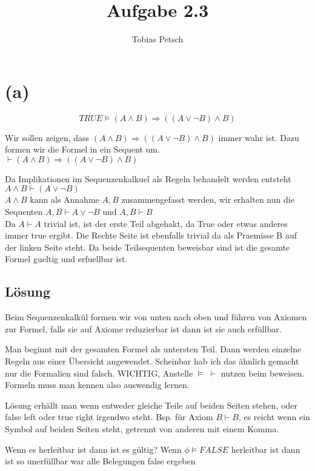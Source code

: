 \documentclass[a4paper,12pt]{article}
\title{Aufgabe 2.3}
\author{Tobias Petsch}
\date{}
\begin{document}
\maketitle

\section*{(a)}

\[
TRUE \models (A \land B) \Rightarrow ((A \lor \neg B) \land B)
\]

Wir sollen zeigen, dass $(A \land B) \Rightarrow ((A \lor \neg B) \land B)$ immer wahr ist.
Dazu formen wir die Formel in ein Sequent um. \\
$\vdash (A \land B) \Rightarrow ((A \lor \neg B) \land B)$

Da Implikationen im Sequenzenkalkuel als Regeln behandelt werden entsteht \\
$A \land B \vdash (A \lor \neg B)$ \\

$A \land B$ kann als Annahme $A,B$ zusammengefasst werden, wir erhalten nun die Sequenten 
$A,B \vdash A \lor \neg B \text{ und } A,B \vdash B$ \\
Da $A \vdash A$ trivial ist, ist der erste Teil abgehakt, da True oder etwas anderes immer true ergibt.
Die Rechte Seite ist ebenfalls trivial da als Praemisse B auf der linken Seite steht. Da beide Teilsequenten beweisbar
sind ist die gesamte Formel gueltig und erfuellbar ist. 

\subsection*{Lösung}

Beim Sequenzenkalkül formen wir von unten nach oben und führen von Axiomen zur Formel, falls sie
auf Axiome reduzierbar ist dann ist sie auch erfüllbar.

Man beginnt mit der gesamten Formel als untersten Teil.
Dann werden einzelne Regeln aus einer Übersicht angewendet.
Scheinbar hab ich das ähnlich gemacht nur die Formalien sind falsch.
WICHTIG, Anstelle $\models$ $\vdash$ nutzen beim beweisen. 
Formeln muss man kennen also auswendig lernen.

Lösung erhällt man wenn entweder gleiche Teile auf beiden Seiten stehen, oder false left oder true right irgendwo steht.
Bsp. für Axiom $B \vdash B$, es reicht wenn ein Symbol auf beiden Seiten steht, getrennt von anderen mit einem Komma.

Wenn es herleitbar ist dann ist es gültig?
Wenn $\phi \models FALSE$ herleitbar ist dann ist so unerfüllbar war alle Belegungen false ergeben
\end{document}
